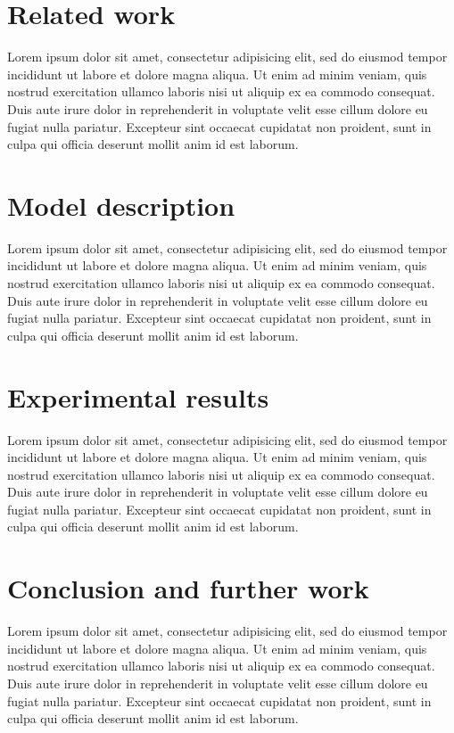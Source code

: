 \documentclass[times, utf8, seminar]{fer}
\begin{document}
\chapter{Related work}
Lorem ipsum dolor sit amet, consectetur adipisicing elit, sed do eiusmod tempor incididunt ut labore et dolore magna aliqua. Ut enim ad minim veniam, quis nostrud exercitation ullamco laboris nisi ut aliquip ex ea commodo consequat. Duis aute irure dolor in reprehenderit in voluptate velit esse cillum dolore eu fugiat nulla pariatur. Excepteur sint occaecat cupidatat non proident, sunt in culpa qui officia deserunt mollit anim id est laborum.
\chapter{Model description}
Lorem ipsum dolor sit amet, consectetur adipisicing elit, sed do eiusmod tempor incididunt ut labore et dolore magna aliqua. Ut enim ad minim veniam, quis nostrud exercitation ullamco laboris nisi ut aliquip ex ea commodo consequat. Duis aute irure dolor in reprehenderit in voluptate velit esse cillum dolore eu fugiat nulla pariatur. Excepteur sint occaecat cupidatat non proident, sunt in culpa qui officia deserunt mollit anim id est laborum.
\chapter{Experimental results}
Lorem ipsum dolor sit amet, consectetur adipisicing elit, sed do eiusmod tempor incididunt ut labore et dolore magna aliqua. Ut enim ad minim veniam, quis nostrud exercitation ullamco laboris nisi ut aliquip ex ea commodo consequat. Duis aute irure dolor in reprehenderit in voluptate velit esse cillum dolore eu fugiat nulla pariatur. Excepteur sint occaecat cupidatat non proident, sunt in culpa qui officia deserunt mollit anim id est laborum.
\chapter{Conclusion and further work}
Lorem ipsum dolor sit amet, consectetur adipisicing elit, sed do eiusmod tempor incididunt ut labore et dolore magna aliqua. Ut enim ad minim veniam, quis nostrud exercitation ullamco laboris nisi ut aliquip ex ea commodo consequat. Duis aute irure dolor in reprehenderit in voluptate velit esse cillum dolore eu fugiat nulla pariatur. Excepteur sint occaecat cupidatat non proident, sunt in culpa qui officia deserunt mollit anim id est laborum.\cite{deepnano}
% 


\end{document}
